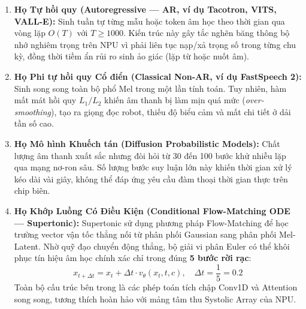 \documentclass[11pt,a4paper,oneside,table]{report}
\begin{document}
\begin{enumerate}
    \item \textbf{Họ Tự hồi quy (Autoregressive --- AR, ví dụ Tacotron, VITS, VALL-E):}
    Sinh tuần tự từng mẫu hoặc token âm học theo thời gian qua vòng lặp $O(T)$ với $T \ge 1000$. Kiến trúc này gây tắc nghẽn băng thông bộ nhớ nghiêm trọng trên NPU vì phải liên tục nạp/xả trọng số trong từng chu kỳ, đồng thời tiềm ẩn rủi ro sinh ảo giác (lặp từ hoặc nuốt âm).
    
    \item \textbf{Họ Phi tự hồi quy Cổ điển (Classical Non-AR, ví dụ FastSpeech 2):}
    Sinh song song toàn bộ phổ Mel trong một lần tính toán. Tuy nhiên, hàm mất mát hồi quy $L_1/L_2$ khiến âm thanh bị làm mịn quá mức (\textit{over-smoothing}), tạo ra giọng đọc robot, thiếu độ biểu cảm và mất chi tiết ở dải tần số cao.
    
    \item \textbf{Họ Mô hình Khuếch tán (Diffusion Probabilistic Models):}
    Chất lượng âm thanh xuất sắc nhưng đòi hỏi từ 30 đến 100 bước khử nhiễu lặp qua mạng nơ-ron sâu. Số lượng bước suy luận lớn này khiến thời gian xử lý kéo dài vài giây, không thể đáp ứng yêu cầu đàm thoại thời gian thực trên chip biên.
    
    \item \textbf{Họ Khớp Luồng Có Điều Kiện (Conditional Flow-Matching ODE --- Supertonic):}
    Supertonic sử dụng phương pháp Flow-Matching để học trường vector vận tốc thẳng nối từ phân phối Gaussian sang phân phối Mel-Latent. Nhờ quỹ đạo chuyển động thẳng, bộ giải vi phân Euler có thể khôi phục tín hiệu âm học chính xác chỉ trong đúng \textbf{5 bước rời rạc}:
    \begin{equation}
        x_{t + \Delta t} = x_t + \Delta t \cdot v_\theta(x_t, t, c), \quad \Delta t = \frac{1}{5} = 0.2
    \end{equation}
    Toàn bộ cấu trúc bên trong là các phép toán tích chập Conv1D và Attention song song, tương thích hoàn hảo với mảng tâm thu Systolic Array của NPU.
\end{enumerate}
\end{document}
